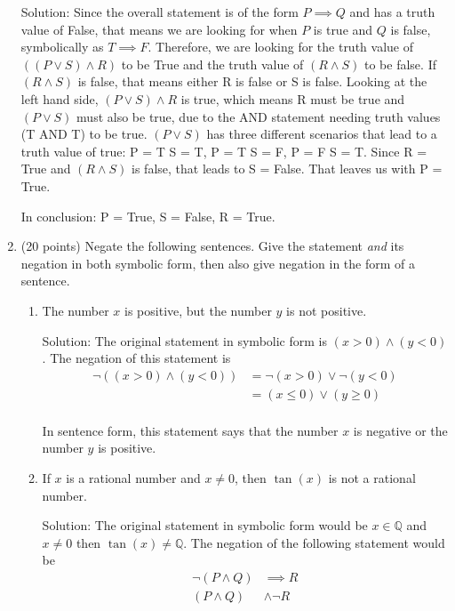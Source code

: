\documentclass[11pt]{amsart}
\newcommand{\Q}{\mathbb{Q}}
\begin{document}
\begin{enumerate}
Solution: Since the overall statement is of the form $P \implies Q$ and has a truth value of False, that means we are looking for when $P$ is true and $Q$ is false, symbolically as $ T \implies F$. Therefore, we are looking for the truth value of $((P \vee S) \wedge R)$ to be True and the truth value of $(R \wedge S) $ to be false. If $( R \wedge S) $ is false, that means either R is false or S is false. Looking at the left hand side, $(P \vee S) \wedge R$ is true, which means R must be true and $(P \vee S) $ must also be true, due to the AND statement needing truth values (T AND T) to be true. $(P \vee S)$ has three different scenarios that lead to a truth value of true: P = T S = T, P = T S = F, P = F S = T. Since R = True and $(R \wedge S) $ is false, that leads to S = False. That leaves us with P = True.

In conclusion: P = True, S = False, R = True.


\vspace{.2in}

\item (20 points) Negate the following sentences. Give the statement \emph{and} its negation in both symbolic form, then also give negation in the form of a sentence.
\begin{enumerate}
\item The number $x$ is positive, but the number $y$ is not positive.

Solution: The original statement in symbolic form is $(x > 0) \wedge (y < 0)$. The negation of this statement is 
\begin{align*}
\neg ((x > 0) \wedge (y < 0)) &= \neg (x > 0) \vee \neg (y < 0) \\
                              &= (x \leq 0) \vee (y \geq 0) \\
\end{align*}

In sentence form, this statement says that the number $x$ is negative or the number $y$ is positive.

\item If $x$ is a rational number and $x \neq 0$, then $\tan(x)$ is not a rational number.


Solution: The original statement in symbolic form would be $x \in \Q$ and $x\neq 0$ then $\tan(x) \neq \Q$. The negation of the following statement would be 
\begin{align*}
    \neg(P \wedge Q)&\implies R\\
    (P \wedge Q) & \wedge \neg R\\
\end{align*}



\end{enumerate}
\end{enumerate}
\end{document}
